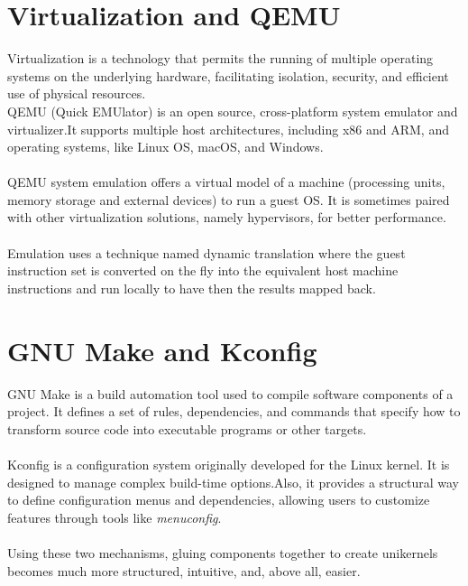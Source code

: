 \section{Virtualization and QEMU}
\label{sec:virtqemu}
Virtualization\cite{ibm-virtualization} is a technology that permits the running of multiple operating systems on the underlying hardware\cite{cherryservers-virtualization-vs-containerization}, facilitating isolation, security, and efficient use of physical resources.
\\
QEMU\cite{qemu-home} (Quick EMUlator) is an open source, cross-platform system emulator and virtualizer.\@ It supports multiple host architectures, including x86 and ARM, and operating systems, like Linux OS, macOS, and Windows. \\
\\
QEMU system emulation offers a virtual model of a machine (processing units, memory storage and external devices) to run a guest OS. It is sometimes paired with other virtualization solutions, namely hypervisors\cite{vmware-hypervisor}, for
better performance.
\\
\\
Emulation uses a technique named dynamic translation\cite{qemu-tcg-doc}\cite{xilinx-qemu-user-doc} where the guest instruction set is converted on the fly into the equivalent host machine instructions and run locally to have then the results mapped back.
\newpage
\section{GNU Make and Kconfig}
GNU Make\cite{gnu-make-manual} is a build automation tool used to compile software components of a project.
It defines a set of rules, dependencies, and commands that specify how to transform source code into executable programs or other targets\cite{devgenius-makefiles-guide}.
\\
\\
Kconfig\cite{kernel-kconfig-language} is a configuration system originally developed for the Linux kernel. It is designed to manage complex build-time options.\@ Also, it provides a structural way to define configuration menus and dependencies, allowing users to customize features through tools like \textit{menuconfig}.
\\
\\
Using these two mechanisms, gluing components together to create unikernels becomes much more structured, intuitive, and, above all, easier.
\newpage
